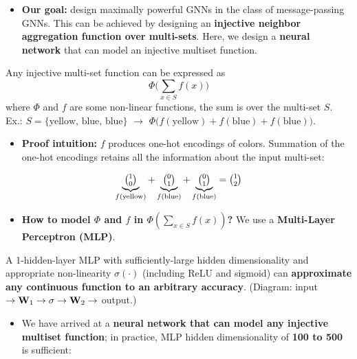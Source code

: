 \begin{itemize}
  \item \textbf{Our goal:} design maximally powerful GNNs in the class of
    message-passing GNNs. This can be achieved by designing an \textbf{injective
    neighbor aggregation function over multi-sets}. Here, we design a
    \textbf{neural network} that can model an injective multiset function.
\end{itemize}
\begin{proposition}\label{prop:lec06-multiset}
  Any injective multi-set function can be expressed as
  \begin{equation}\label{eq:lec06-multiset}
    \Phi\Big(\sum_{x\in S} f(x)\Big)
  \end{equation}
  where $\Phi$ and $f$ are some non-linear functions, the sum is over the
  multi-set $S$. Ex.: $S=\{\text{yellow, blue, blue}\}$ $\to$
  $\Phi\big(f(\text{yellow})+f(\text{blue})+f(\text{blue})\big)$.
\end{proposition}
\begin{itemize}
  \item \textbf{Proof intuition:} $f$ produces one-hot encodings of colors.
    Summation of the one-hot encodings retains all the information about the
    input multi-set:
\end{itemize}
\begin{equation}\label{eq:lec06-onehotsum}
  \underbrace{\tbinom{1}{0}}_{f(\text{yellow})} + \underbrace{\tbinom{0}{1}}_{f(\text{blue})}
  + \underbrace{\tbinom{0}{1}}_{f(\text{blue})} = \tbinom{1}{2}
\end{equation}
\begin{itemize}
  \item \textbf{How to model $\Phi$ and $f$ in $\Phi(\sum_{x\in S}f(x))$?} We use
    a \textbf{Multi-Layer Perceptron (MLP)}.
\end{itemize}
\begin{proposition}\label{prop:lec06-uat}
  A 1-hidden-layer MLP with sufficiently-large hidden dimensionality and
  appropriate non-linearity $\sigma(\cdot)$ (including ReLU and sigmoid) can
  \textbf{approximate any continuous function to an arbitrary accuracy}.
  (Diagram: input $\to\mathbf{W}_1\to\sigma\to\mathbf{W}_2\to$ output.)
\end{proposition}
\begin{itemize}
  \item We have arrived at a \textbf{neural network that can model any injective
    multiset function}; in practice, MLP hidden dimensionality of \textbf{100 to
    500} is sufficient:
\end{itemize}
